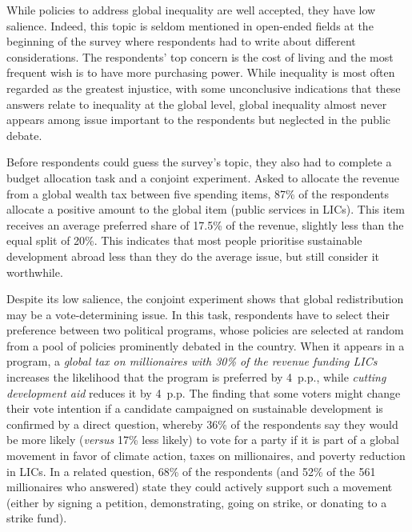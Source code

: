 \documentclass[12pt,english]{article}
\begin{document}
\begin{bibunit}
While policies to address global inequality are well accepted, they have low salience. Indeed, this topic is seldom mentioned in open-ended fields at the beginning of the survey where respondents had to write about different considerations. The respondents' top concern is the cost of living and the most frequent wish is to have more purchasing power. While inequality is most often regarded as the greatest injustice, with some unconclusive indications that these answers relate to inequality at the global level, global inequality almost never appears among issue important to the respondents but neglected in the public debate. 

Before respondents could guess the survey's topic, they also had to complete a budget allocation task and a conjoint experiment. Asked to allocate the revenue from a %
global wealth tax between five spending items, 87\% of the respondents allocate a positive amount to the global item (public services in LICs). This item receives an average preferred share of 17.5\% of the revenue, slightly less than the equal split of 20\%. %
This indicates that most people prioritise sustainable development abroad less than they do the average issue, but still consider it worthwhile. 

Despite its low salience, the conjoint experiment shows that global redistribution may be a vote-determining issue. In this task, respondents have to select their preference between two political programs, whose policies are selected at random from a pool of policies prominently debated in the country. When it appears in a program, a \textit{global tax on millionaires with 30\% of the revenue funding LICs} increases the likelihood that the program is preferred by 4~p.p., while \textit{cutting development aid} reduces it by 4~p.p. The finding that some voters might change their vote intention if a candidate campaigned on sustainable development is confirmed by a direct question, whereby 36\% of the respondents say they would be more likely (\textit{versus} 17\% less likely) to vote for a party if it is part of a global movement in favor of climate action, taxes on millionaires, and poverty reduction in LICs. In a related question, 68\% of the respondents (and 52\% of the 561 millionaires who answered) state they could actively support such a movement (either by signing a petition, demonstrating, going on strike, or donating to a strike fund). 


\end{bibunit}
\end{document}
